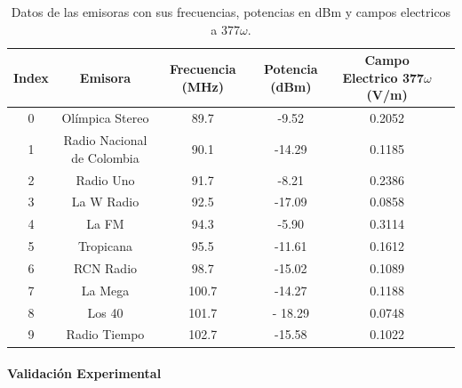 \begin{table}[ht]
	\centering
	\footnotesize
	\begin{tabular}{cccccc}
		\toprule
		Index & Emisora & Frecuencia (MHz) & Potencia (dBm) & Campo Electrico 377$\omega$ (V/m) \\
		\midrule
		0 & Ol\'impica Stereo & 89.7  & -9.52  & 0.2052  \\
		1 & Radio Nacional de Colombia & 90.1  & -14.29 & 0.1185  \\
		2 & Radio Uno & 91.7  & -8.21  & 0.2386  \\
		3 & La W Radio & 92.5  & -17.09 & 0.0858  \\
		4 & La FM & 94.3  & -5.90  & 0.3114  \\
		5 & Tropicana & 95.5  & -11.61 & 0.1612  \\
		6 & RCN Radio & 98.7  & -15.02 & 0.1089  \\
		7 & La Mega & 100.7  & -14.27 & 0.1188  \\
		8 & Los 40 & 101.7  & -    18.29 & 0.0748  \\
		9 & Radio Tiempo & 102.7 & -15.58 & 0.1022  \\
		\bottomrule
	\end{tabular}
	
	\caption{Datos de las emisoras con sus frecuencias, potencias en dBm y campos electricos a 377$\omega$.}
\end{table}
\clearpage\newpage
\paragraph{Validaci\'on Experimental}


